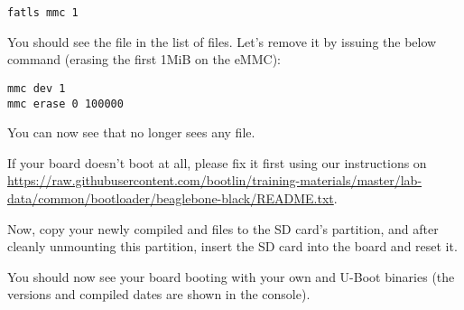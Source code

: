 \begin{verbatim}
fatls mmc 1
\end{verbatim}

You should see the  file in the list of files. Let's remove it
by issuing the below command (erasing the first 1MiB on the eMMC):

\begin{verbatim}
mmc dev 1
mmc erase 0 100000
\end{verbatim}

You can now see that  no longer sees any file.

If your board doesn't boot at all, please fix it first using our instructions
on
\url{https://raw.githubusercontent.com/bootlin/training-materials/master/lab-data/common/bootloader/beaglebone-black/README.txt}.

Now, copy your newly compiled  and  files to
the SD card's  partition, and after cleanly unmounting this
partition, insert the SD card into the board and reset it.

You should now see your board booting with your own  and U-Boot
binaries (the versions and compiled dates are shown in the console). 
